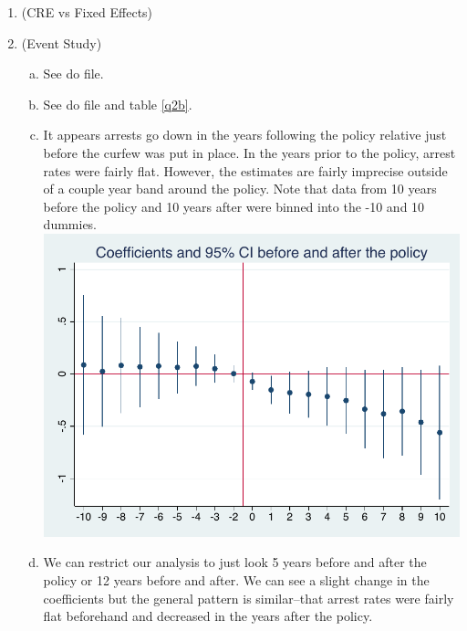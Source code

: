 \documentclass[11pt]{article}
\begin{document}
\begin{center}
\end{center}

\begin{enumerate}[1)]
	\item (CRE vs Fixed Effects)
	\item (Event Study)
	\begin{enumerate}[(a)]
		\item See do file.
		\item See do file and table \ref{q2b}. \\
		
		\item  It appears arrests go down in the years following the policy relative just before the curfew was put in place. In the years prior to the policy, arrest rates were fairly flat. However, the estimates are fairly imprecise outside of a couple year band around the policy. Note that data from 10 years before the policy and 10 years after were binned into the -10 and 10 dummies.\\
		\includegraphics[scale=.8]{input/coef_plot_10year.pdf}
		\item We can restrict our analysis to just look 5 years before and after the policy or 12 years before and after. We can see a slight change in the coefficients but the general pattern is similar--that arrest rates were fairly flat beforehand and decreased in the years after the policy.\\

\end{enumerate}
\end{enumerate}
\end{document}
